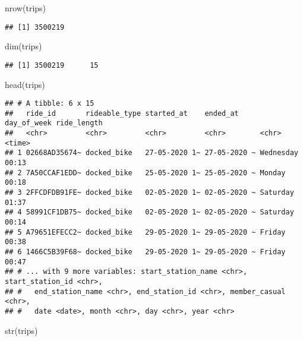 \documentclass[
]{article}
\newenvironment{Shaded}{\begin{snugshade}}{\end{snugshade}}
\newcommand{\FunctionTok}[1]{\textcolor[rgb]{0.00,0.00,0.00}{#1}}
\newcommand{\NormalTok}[1]{#1}
\begin{document}
\begin{Shaded}
\begin{Highlighting}[]
\FunctionTok{nrow}\NormalTok{(trips)}
\end{Highlighting}
\end{Shaded}

\begin{verbatim}
## [1] 3500219
\end{verbatim}

\begin{Shaded}
\begin{Highlighting}[]
\FunctionTok{dim}\NormalTok{(trips)}
\end{Highlighting}
\end{Shaded}

\begin{verbatim}
## [1] 3500219      15
\end{verbatim}

\begin{Shaded}
\begin{Highlighting}[]
\FunctionTok{head}\NormalTok{(trips)}
\end{Highlighting}
\end{Shaded}

\begin{verbatim}
## # A tibble: 6 x 15
##   ride_id       rideable_type started_at    ended_at     day_of_week ride_length
##   <chr>         <chr>         <chr>         <chr>        <chr>       <time>     
## 1 02668AD35674~ docked_bike   27-05-2020 1~ 27-05-2020 ~ Wednesday   00:13      
## 2 7A50CCAF1EDD~ docked_bike   25-05-2020 1~ 25-05-2020 ~ Monday      00:18      
## 3 2FFCDFDB91FE~ docked_bike   02-05-2020 1~ 02-05-2020 ~ Saturday    01:37      
## 4 58991CF1DB75~ docked_bike   02-05-2020 1~ 02-05-2020 ~ Saturday    00:14      
## 5 A79651EFECC2~ docked_bike   29-05-2020 1~ 29-05-2020 ~ Friday      00:38      
## 6 1466C5B39F68~ docked_bike   29-05-2020 1~ 29-05-2020 ~ Friday      00:47      
## # ... with 9 more variables: start_station_name <chr>, start_station_id <chr>,
## #   end_station_name <chr>, end_station_id <chr>, member_casual <chr>,
## #   date <date>, month <chr>, day <chr>, year <chr>
\end{verbatim}

\begin{Shaded}
\begin{Highlighting}[]
\FunctionTok{str}\NormalTok{(trips)}
\end{Highlighting}
\end{Shaded}
\end{document}
